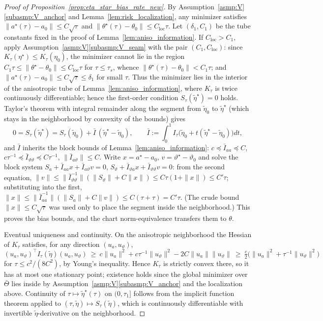 \documentclass[11pt]{article}
\theoremstyle{definition}
\theoremstyle{plain}
\begin{document}
\begin{proof}[Proof of Proposition~\ref{prop:eta_star_bias_rate_new}]
By Assumption~\ref{asmp:V}\ref{subasmp:V_anchor} and Lemma~\ref{lem:risk_localization}, any minimizer satisfies $\|a^\star(\tau)-a_0\|\le C\sqrt\tau$ and $\|\theta^\star(\tau)-\theta_0\|\le C_{\mathrm{loc}}\tau$. Let $(\delta_1,C_1)$ be the tube constants fixed in the proof of Lemma~\ref{lem:aniso_information}. If $C_{\mathrm{loc}}>C_1$, apply Assumption~\ref{asmp:V}\ref{subasmp:V_seam} with the pair $(C_1,C_{\mathrm{loc}})$: since $K_\tau(\eta^\star)\le K_\tau(\eta_0)$, the minimizer cannot lie in the region $C_1\tau\le\|\theta^\star-\theta_0\|\le C_{\mathrm{loc}}\tau$ for $\tau\le\tau_s$, whence $\|\theta^\star(\tau)-\theta_0\|<C_1\tau$; and $\|a^\star(\tau)-a_0\|\le C\sqrt\tau\le\delta_1$ for small $\tau$. Thus the minimizer lies in the interior of the anisotropic tube of Lemma~\ref{lem:aniso_information}, where $K_\tau$ is twice continuously differentiable; hence the first-order condition $S_\tau(\tilde\eta^\star)=0$ holds. Taylor's theorem with integral remainder along the segment from $\tilde\eta_0$ to $\tilde\eta^\star$ (which stays in the neighborhood by convexity of the bounds) gives
\[
0=S_\tau(\tilde\eta^\star)=S_\tau(\tilde\eta_0)+\bar I\,(\tilde\eta^\star-\tilde\eta_0),
\qquad
\bar I:=\int_0^1I_\tau\big(\tilde\eta_0+t(\tilde\eta^\star-\tilde\eta_0)\big)dt ,
\]
and $\bar I$ inherits the block bounds of Lemma~\ref{lem:aniso_information}:
$c\preceq\bar I_{aa}\preceq C$, $c\tau^{-1}\preceq\bar I_{\vartheta\vartheta}\preceq C\tau^{-1}$, $\|\bar I_{a\vartheta}\|\le C$.
Write $x=a^\star-a_0$, $v=\vartheta^\star-\vartheta_0$ and solve the block system
$S_a+\bar I_{aa}x+\bar I_{a\vartheta}v=0$, $S_\vartheta+\bar I_{\vartheta a}x+\bar I_{\vartheta\vartheta}v=0$:
from the second equation, $\|v\|\le\|\bar I_{\vartheta\vartheta}^{-1}\|(\|S_\vartheta\|+C\|x\|)\le C\tau(1+\|x\|)\le C'\tau$;
substituting into the first, $\|x\|\le\|\bar I_{aa}^{-1}\|(\|S_a\|+C\|v\|)\le C(\tau+\tau)=C'\tau$.
(The crude bound $\|x\|\le C\sqrt\tau$ was used only to place the segment inside the neighborhood.) This proves the bias bounds, and the chart norm-equivalence transfers them to $\theta$.

Eventual uniqueness and continuity. On the anisotropic neighborhood the Hessian of $K_\tau$ satisfies, for any direction $(u_a,u_\vartheta)$,
\[
(u_a,u_\vartheta)^\top I_\tau(\tilde\eta)(u_a,u_\vartheta)
\ \ge\ c\|u_a\|^2+c\tau^{-1}\|u_\vartheta\|^2-2C\|u_a\|\|u_\vartheta\|
\ \ge\ \tfrac{c}{2}\big(\|u_a\|^2+\tau^{-1}\|u_\vartheta\|^2\big)
\]
for $\tau\le c^2/(8C^2)$, by Young's inequality. Hence $K_\tau$ is strictly convex there, so it has at most one stationary point; existence holds since the global minimizer over $\bar\Theta$ lies inside by Assumption~\ref{asmp:V}\ref{subasmp:V_anchor} and the localization above. Continuity of $\tau\mapsto\tilde\eta^\star(\tau)$ on $(0,\tau_1]$ follows from the implicit function theorem applied to $(\tau,\tilde\eta)\mapsto S_\tau(\tilde\eta)$, which is continuously differentiable with invertible $\tilde\eta$-derivative on the neighborhood.
\end{proof}
\end{document}
